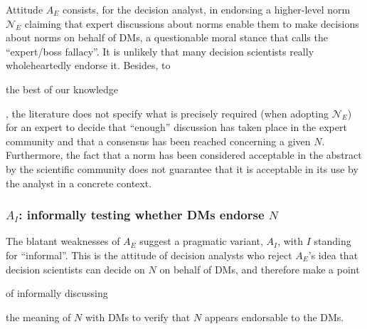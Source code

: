 \documentclass[preprint, french, english, 11pt, authoryear]{elsarticle}%
\newcommand{\protectforpdf}[1]{\texorpdfstring{\ensuremath{#1}}{#1}}
\begin{document}

Attitude $A_E$ consists, for the decision analyst, in endorsing a higher-level norm $\mathscr{N}_E$ claiming that expert discussions about norms enable them to make decisions about norms on behalf of \acp{DM}, a questionable moral stance that \citet{estlund_democratic_2009} calls the ``expert/boss fallacy''. It is unlikely that many decision scientists really wholeheartedly endorse it. 
Besides, to \begin{changebar}the best of our knowledge\end{changebar}, the literature does not specify what is precisely required (when adopting  $\mathscr{N}_E$) for an expert to decide that “enough” discussion has taken place in the expert community and that a consensus has been reached concerning a given $N$. 
Furthermore, the fact that a norm has been considered acceptable in the abstract by the scientific community does not guarantee that it is acceptable in its use by the analyst in a concrete context.

\subsubsection{\texorpdfstring{$A_I$}{AI}: informally testing whether \aclp{DM} endorse \protectforpdf{N}}
The blatant weaknesses of $A_E$ suggest a pragmatic variant, $A_I$, with $I$ standing for “informal”. 
This is the attitude of decision analysts who reject $A_E$'s idea that decision scientists can decide on $N$ on behalf of \acp{DM}, and therefore make a point \begin{changebar}of informally discussing\end{changebar} the meaning of $N$ with \acp{DM} to verify that %
$N$ appears endorsable to the \acp{DM}.%
\end{document}
